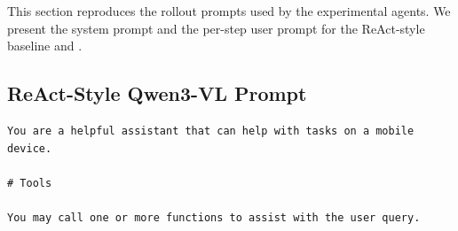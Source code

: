 This section reproduces the rollout prompts used by the experimental agents. We present the system prompt and the per-step user prompt for the ReAct-style baseline and \ourmethod.

\subsection{ReAct-Style Qwen3-VL Prompt}
\label{sec:appendix-react-prompt}

\begin{tcolorbox}[
  promptstyle,
  title=\texttt{Prompt for ReAct-Style Qwen3-VL (system prompt).},
]
\begin{Verbatim}[fontsize=\scriptsize,breaklines,breakanywhere]
You are a helpful assistant that can help with tasks on a mobile device.

# Tools

You may call one or more functions to assist with the user query.


\end{Verbatim}
\end{tcolorbox}
